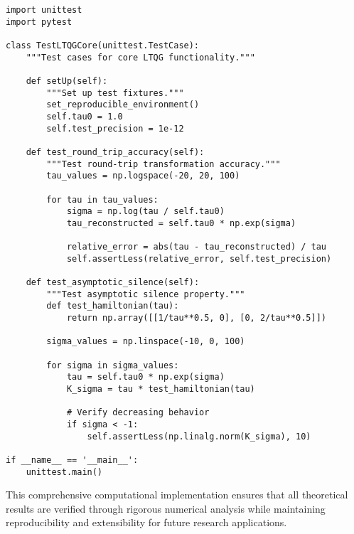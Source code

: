 \begin{verbatim}
import unittest
import pytest

class TestLTQGCore(unittest.TestCase):
    """Test cases for core LTQG functionality."""
    
    def setUp(self):
        """Set up test fixtures."""
        set_reproducible_environment()
        self.tau0 = 1.0
        self.test_precision = 1e-12
    
    def test_round_trip_accuracy(self):
        """Test round-trip transformation accuracy."""
        tau_values = np.logspace(-20, 20, 100)
        
        for tau in tau_values:
            sigma = np.log(tau / self.tau0)
            tau_reconstructed = self.tau0 * np.exp(sigma)
            
            relative_error = abs(tau - tau_reconstructed) / tau
            self.assertLess(relative_error, self.test_precision)
    
    def test_asymptotic_silence(self):
        """Test asymptotic silence property."""
        def test_hamiltonian(tau):
            return np.array([[1/tau**0.5, 0], [0, 2/tau**0.5]])
        
        sigma_values = np.linspace(-10, 0, 100)
        
        for sigma in sigma_values:
            tau = self.tau0 * np.exp(sigma)
            K_sigma = tau * test_hamiltonian(tau)
            
            # Verify decreasing behavior
            if sigma < -1:
                self.assertLess(np.linalg.norm(K_sigma), 10)

if __name__ == '__main__':
    unittest.main()
\end{verbatim}

This comprehensive computational implementation ensures that all theoretical results are verified through rigorous numerical analysis while maintaining reproducibility and extensibility for future research applications.